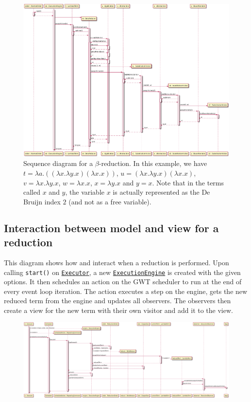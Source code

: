\begin{figure}[H]
	\centering
	\includegraphics[width=\textwidth]{sequenceDiagrams/betaReduction}
	\caption{Sequence diagram for a $\beta$-reduction. In this example, we have $t = \lambda a.((\lambda x.\lambda y.x)(\lambda x.x))$,
		$u = (\lambda x.\lambda y.x)(\lambda x.x)$, $v = \lambda x.\lambda y.x$,
		$w = \lambda x.x$, $x = \lambda y.x$ and $y = x$. Note that in the terms called
		$x$ and $y$, the variable $x$ is actually represented as the De Bruijn index $2$
		(and not as a free variable).}
\end{figure}

\subsection{Interaction between model and view for a reduction}
This diagram shows how \texttt{} and \texttt{} interact when a reduction is performed. 
Upon calling \texttt{start()} on \texttt{\hyperref[type:edu.kit.wavelength.client.view.execution.Executor]{Executor}}, 
a new \texttt{\hyperref[type:edu.kit.wavelength.client.model.ExecutionEngine]{ExecutionEngine}} is created with the given options.
It then schedules an action on the GWT scheduler to run at the end of every event loop iteration.
The action executes a step on the engine, gets the new reduced term from the engine and updates all observers.
The observers then create a view for the new term with their own visitor and add it to the view.

\begin{figure}[H]
	\centering
	\includegraphics[width=\textwidth]{sequenceDiagrams/interaction}
\end{figure}